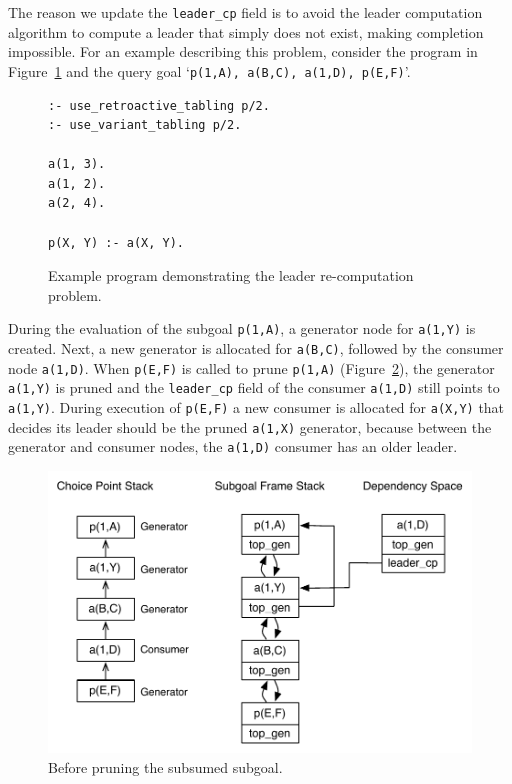 The reason we update the \texttt{leader\_cp} field is to avoid the leader computation algorithm to compute
a leader that simply does not exist, making completion impossible.
For an example describing this problem, consider the program in Figure~\ref{fig:retro_leader_program}
and the query goal `\texttt{p(1,A),~a(B,C),~a(1,D),~p(E,F)}'.

\begin{figure}[ht]
\begin{Verbatim}
:- use_retroactive_tabling p/2.
:- use_variant_tabling p/2.

a(1, 3).
a(1, 2).
a(2, 4).

p(X, Y) :- a(X, Y).
\end{Verbatim}
\caption{Example program demonstrating the leader re-computation problem.}
\label{fig:retro_leader_program}
\end{figure}

During the evaluation of the subgoal \texttt{p(1,A)}, a generator node
for \texttt{a(1,Y)} is created. Next, a new generator is allocated for \texttt{a(B,C)},
followed by the consumer node \texttt{a(1,D)}. When \texttt{p(E,F)} is called to
prune \texttt{p(1,A)} (Figure~\ref{fig:retro_leader_recomputation}), the generator \texttt{a(1,Y)}
is pruned and the \texttt{leader\_cp}
field of the consumer \texttt{a(1,D)} still points to \texttt{a(1,Y)}.
During execution of \texttt{p(E,F)} a new consumer is allocated for \texttt{a(X,Y)} that
decides its leader should be the pruned \texttt{a(1,X)} generator, because between
the generator and consumer nodes, the \texttt{a(1,D)} consumer has an older leader.

\begin{figure}[ht]
  \centering
    \includegraphics[scale=0.6]{retro_leader_recomputation.pdf}
  \caption{Before pruning the subsumed subgoal.}
  \label{fig:retro_leader_recomputation}
\end{figure}

